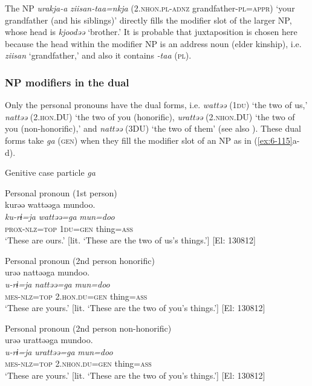 The NP \textit{urakja-a} \textit{ziisan-taa=nkja} (2.\textsc{nhon}.\textsc{pl}-\textsc{adnz} grandfather-\textsc{pl}=\textsc{appr}) ‘your grandfather (and his siblings)’ directly fills the modifier slot of the larger NP, whose head is \textit{kjoodəə} ‘brother.’ It is probable that juxtaposition is chosen here because the head within the modifier NP is an address noun (elder kinship), i.e. \textit{ziisan} ‘grandfather,’ and also it contains \textit{-taa} (\textsc{pl}).

\subsubsection{NP modifiers in the dual}

Only the personal pronouns have the dual forms, i.e. \textit{wattəə} (1\textsc{du}) ‘the two of us,’ \textit{nattəə} (2.\textsc{hon}.DU) ‘the two of you (honorific), \textit{urattəə} (2.\textsc{nhon}.DU) ‘the two of you (non-honorific),’ and \textit{nattəə} (3DU) ‘the two of them’ (see also ). These dual forms take \textit{ga} (\textsc{gen}) when they fill the modifier slot of an NP as in (\ref{ex:6-115}a-d).

\ea\label{ex:6-115}
  Genitive case particle \textit{ga}

 \ea Personal pronoun (1st person)\\
{\TM}
\glll  kurəə  wattəəga  mundoo.\\
\textit{ku-rɨ=ja}  \textit{wattəə=ga}  \textit{mun=doo}\\
\textsc{prox}-\textsc{nlz}=\textsc{top}  1\textsc{du}=\textsc{gen}  thing=\textsc{ass}\\
\glt ‘These are ours.’ [lit. ‘These are the two of us’s things.’]      [El: 130812]

\ex Personal pronoun (2nd person honorific)\\
{\TM}
\glll  urəə  nattəəga  mundoo.\\
\textit{u-rɨ=ja}  \textit{nattəə=ga}  \textit{mun=doo}\\
\textsc{mes}-\textsc{nlz}=\textsc{top}  2.\textsc{hon}.\textsc{du}=\textsc{gen}  thing=\textsc{ass}\\
\glt ‘These are yours.’ [lit. ‘These are the two of you’s things.’]       [El: 130812]

\ex Personal pronoun (2nd person non-honorific)\\
{\TM}
\glll  urəə  urattəəga  mundoo.\\
\textit{u-rɨ=ja}  \textit{urattəə=ga}  \textit{mun=doo}\\
\textsc{mes}-\textsc{nlz}=\textsc{top}  2.\textsc{nhon}.\textsc{du}=\textsc{gen}  thing=\textsc{ass}\\
\glt ‘These are yours.’ [lit. ‘These are the two of you’s things.’]       [El: 130812]

